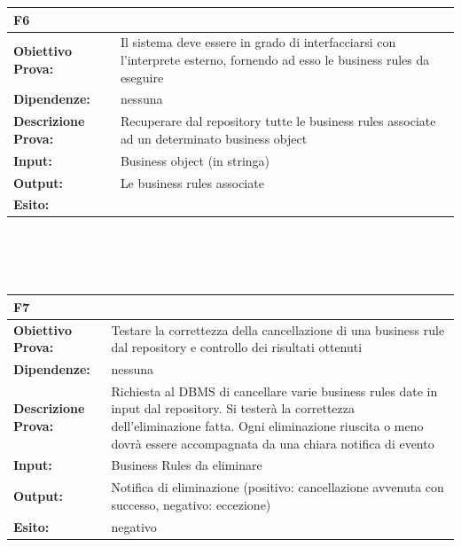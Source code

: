 \documentclass[11pt,titlepage,a4paper]{report}
\begin{document}
\begin{tabular}{||p{4.5cm}||p{7.5cm}||}
\hline
\textbf{\textsf{F6}}& \\
\hline
{\textbf {Obiettivo Prova:}}& Il sistema deve essere in grado di interfacciarsi con l'interprete esterno, fornendo ad esso le business rules da eseguire \\ \hline
{\textbf{Dipendenze:}}& nessuna \\ \hline
{\textbf{Descrizione Prova:}}&  Recuperare dal repository tutte le business rules associate ad un determinato business object\\ \hline
{\textbf{Input:}}&  Business object (in stringa) \\ \hline
{\textbf{Output:}}& Le business rules associate\\ \hline
{\textbf{Esito:}}&  \\ \hline
\end{tabular} \\
\\
\\
\begin{tabular}{||p{4.5cm}||p{7.5cm}||}
\hline
\textbf{\textsf{F7}}& \\
\hline
{\textbf {Obiettivo Prova:}}& Testare la correttezza della cancellazione di una business rule dal repository e controllo dei risultati ottenuti\\ \hline
{\textbf{Dipendenze:}}& nessuna \\ \hline
{\textbf{Descrizione Prova:}}&  Richiesta al DBMS di cancellare varie business rules date in input dal repository. Si tester\`a la correttezza dell'eliminazione fatta. Ogni eliminazione riuscita o meno dovr\`a essere accompagnata da una chiara notifica di evento\\ \hline
{\textbf{Input:}}& Business Rules da eliminare \\ \hline
{\textbf{Output:}}& Notifica di eliminazione (positivo: cancellazione avvenuta con successo, negativo: eccezione) \\ \hline
{\textbf{Esito:}}&  negativo \\ \hline
\end{tabular} \\
\\
\\
\end{document}
